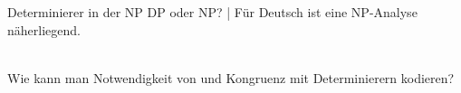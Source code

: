 \begin{frame}
  {Determinierer in der NP}
  \onslide<+->
  \onslide<+->
  DP oder NP? | \alert{Für Deutsch ist eine NP-Analyse näherliegend.}\\
  \onslide<+->
  \Zeile
  \\
  \onslide<+->
  \Zeile
  Wie kann man \alert{Notwendigkeit von} und \alert{Kongruenz mit} Determinierern kodieren?
  \onslide<+->
  \onslide<+->
\end{frame}

\newcommand{\AvmA}{%
  \begin{avm}
    \[ \asort{nomen}
    graphen & \textit{Tischs} \\
    person & \gruen{\@1 drei} \\
    genus & \gruen{\@2 maskulin} \\
    numerus & \gruen{\@3 singular} \\
    kasus & \gruen{\@4 genitiv} \\
    valenz & \<\[ \asort{determinierer} 
      genus & \ \gruen{\@2} \\
      numerus & \gruen{\@3} \\
      kasus & \ \gruen{\@4}
                           \]\>
  \]
  \end{avm}%
}

\newcommand{\AvmB}{%
  \begin{avm}
    \[ \asort{determinierer}
      graphen & \textit{des} \\
       genus & \gruen{\@2} \\
       numerus & \gruen{\@3} \\
       kasus & \gruen{\@4} \\
       valenz & \<\>
    \]
  \end{avm}
}

